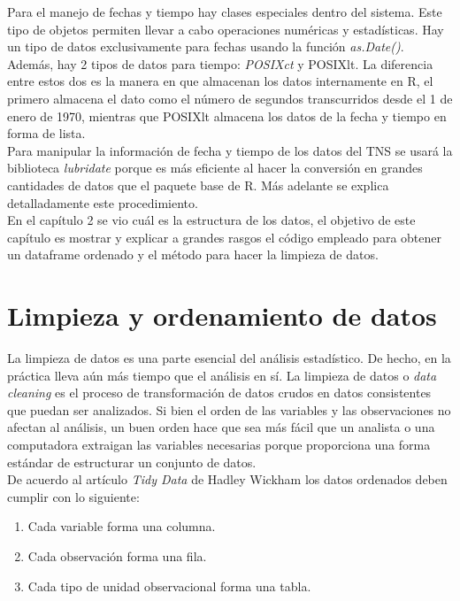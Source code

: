Para el manejo de fechas y tiempo hay clases especiales dentro del sistema. Este tipo de objetos permiten llevar a cabo operaciones numéricas y estadísticas. Hay un tipo de datos exclusivamente para fechas usando la función \emph{as.Date()}. Además, hay  2 tipos de datos para tiempo: \emph{POSIXct} y POSIXlt. La diferencia entre estos dos es la manera en que almacenan los datos internamente en R, el primero almacena el dato como el número de segundos transcurridos desde el 1 de enero de 1970, mientras que POSIXlt almacena los datos de la fecha y tiempo en forma de lista. \\

Para manipular la información de fecha y tiempo de los datos del TNS se usará la biblioteca \emph{lubridate} porque es más eficiente al hacer la conversión en grandes cantidades de datos  que el paquete base de R. Más adelante se explica detalladamente este procedimiento.\\

En el capítulo 2 se vio cuál es la estructura de los datos, el objetivo de este capítulo es mostrar y explicar a grandes rasgos el código empleado para obtener un dataframe ordenado y el método para hacer la limpieza de datos.

\section{Limpieza y ordenamiento de datos}

La limpieza de datos es una parte esencial del análisis estadístico. De hecho, en la práctica lleva aún más tiempo que el análisis en sí. La limpieza de datos o \emph{data cleaning} es el proceso de transformación de datos crudos en datos consistentes que puedan ser analizados. Si bien el orden de las variables y las observaciones no afectan al análisis, un buen orden hace que sea más fácil que un analista o una computadora extraigan las variables necesarias porque proporciona una forma estándar de estructurar un conjunto de datos.\\

De acuerdo al artículo \textit{Tidy Data} de Hadley Wickham\cite{tidy-data} los datos ordenados deben cumplir con lo siguiente:

\begin{enumerate}
\item Cada variable forma una columna.
\item Cada observación forma una fila. 
\item Cada tipo de unidad observacional forma una tabla.
\end{enumerate}

